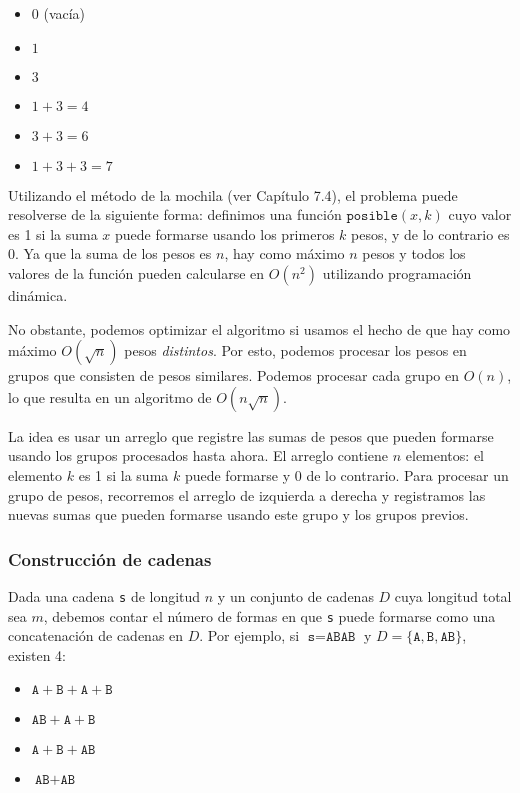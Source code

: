 \begin{itemize}[noitemsep]
    \item $0$ (vacía)
    \item $1$
    \item $3$
    \item $1+3=4$
    \item $3+3=6$
    \item $1+3+3=7$
\end{itemize}

Utilizando el método de la mochila (ver Capítulo 7.4),
el problema puede resolverse de la siguiente forma: definimos una función
$\texttt{posible}(x,k)$ cuyo valor es 1 si la suma $x$ puede formarse
usando los primeros $k$ pesos, y de lo contrario es 0. Ya que la suma de
los pesos es $n$, hay como máximo $n$ pesos y todos los valores de la
función pueden calcularse en $O(n^2)$ utilizando programación dinámica.

No obstante, podemos optimizar el algoritmo si usamos el hecho de que hay
como máximo $O(\sqrt n)$ pesos \emph{distintos}. Por esto, podemos procesar
los pesos en grupos que consisten de pesos similares. Podemos procesar
cada grupo en $O(n)$, lo que resulta en un algoritmo de $O(n \sqrt n)$.

La idea es usar un arreglo que registre las sumas de pesos que pueden
formarse usando los grupos procesados hasta ahora. El arreglo contiene
$n$ elementos: el elemento $k$ es 1 si la suma $k$ puede formarse y 0
de lo contrario. Para procesar un grupo de pesos, recorremos el arreglo
de izquierda a derecha y registramos las nuevas sumas que pueden formarse
usando este grupo y los grupos previos.

\subsubsection{Construcción de cadenas}

Dada una cadena \texttt{s} de longitud $n$ y un conjunto de cadenas $D$
cuya longitud total sea $m$, debemos contar el número de
formas en que \texttt{s} puede formarse como una concatenación de
cadenas en $D$. Por ejemplo, si $\texttt{s}=\texttt{ABAB}$ y
$D=\{\texttt{A},\texttt{B},\texttt{AB}\}$, existen 4:

\begin{itemize}[noitemsep]
    \item $\texttt{A}+\texttt{B}+\texttt{A}+\texttt{B}$
    \item $\texttt{AB}+\texttt{A}+\texttt{B}$
    \item $\texttt{A}+\texttt{B}+\texttt{AB}$
    \item $\texttt{AB}+\texttt{AB}$
\end{itemize}

